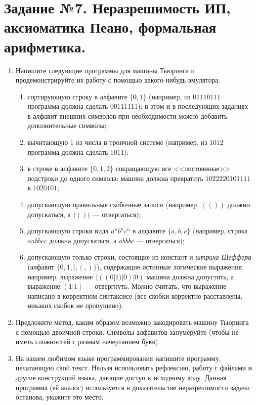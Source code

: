 \documentclass[10pt,a4paper,oneside]{article}
\begin{document}
\section*{Задание №7. Неразрешимость ИП, аксиоматика Пеано, формальная арифметика.}
\begin{enumerate}

\item Напишите следующие программы для машины Тьюринга и продемонстрируйте их работу с помощью какого-нибудь эмулятора:
\begin{enumerate}
\item сортирующую строку в алфавите $\{0,1\}$ (например, из $01110111$ программа должна сделать $00111111$);
в этом и в последующих заданиях в алфавит внешних символов при необходимости можно добавить дополнительные символы;
\item вычитающую 1 из числа в троичной системе (например, из $1012$ программа должна сделать $1011$);
\item в строке в алфавите $\{0,1,2\}$ сокращающую все <<постоянные>> подстроки до одного символа:
машина должна превратить $1022220101111$ в $1020101$;
\item допускающую правильные скобочные записи (например, $(())$ должно допускаться, а $)()($ --- отвергаться);
\item допускающую строки вида $a^nb^nc^n$ в алфавите $\{a,b,c\}$ (например, строка $aabbcc$ должна допускаться, а $abbbc$ --- отвергаться);
\item допускающую только строки, состоящие из констант и \emph{штриха Шеффера} (алфавит $\{ 0, 1, |, (, ) \}$), 
содержащие истинные логические выражения;
например, выражение $(((0 | 1) | 0) | 0)$ машина должна допустить, а
выражение $(1 | 1)$ --- отвергнуть. Можно считать, что выражение написано в корректном синтаксисе (все скобки корректно
расставлены, никаких скобок не пропущено).
\end{enumerate}

\item Предложите метод, каким образом возможно закодировать машину Тьюринга с помощью двоичной строки.
Символы алфавитов занумеруйте (чтобы не иметь сложностей с разным начертанием букв).

\item На вашем любимом языке программирования напишите программу, печатающую свой текст.
Нельзя использовать рефлексию, работу с файлами и другие конструкций языка, дающие доступ к 
исходному коду. Данная программа (её аналог) используется в доказательстве неразрешимости
задачи останова, укажите это место.

\end{enumerate}
\end{document}
